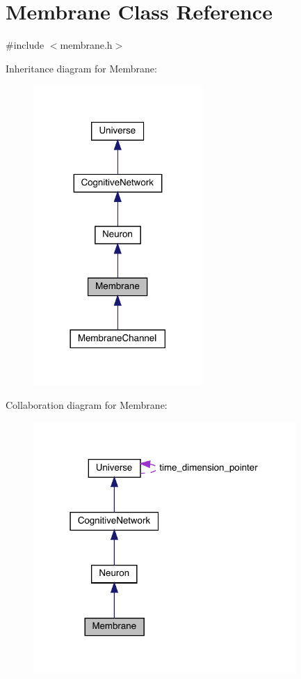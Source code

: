 \hypertarget{class_membrane}{}\section{Membrane Class Reference}
\label{class_membrane}


{\ttfamily \#include $<$membrane.\+h$>$}



Inheritance diagram for Membrane\+:\nopagebreak
\begin{figure}[H]
\begin{center}
\leavevmode
\includegraphics[width=182pt]{class_membrane__inherit__graph}
\end{center}
\end{figure}


Collaboration diagram for Membrane\+:
\nopagebreak
\begin{figure}[H]
\begin{center}
\leavevmode
\includegraphics[width=283pt]{class_membrane__coll__graph}
\end{center}
\end{figure}
